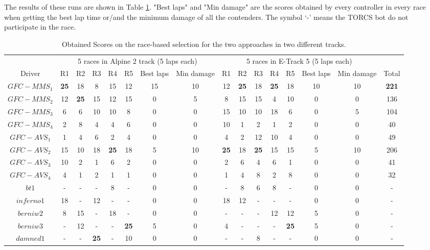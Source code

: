 \documentclass[conference]{IEEEtran}
\begin{document}
The results of these runs are shown in Table \ref{tab:runsresults}. "Best laps" and "Min damage" are the scores obtained by every controller in every race when getting the best lap time or/and the minimum damage of all the contenders. The symbol `-' means the TORCS bot do not participate in the race.

\begin{table}[ht]
  \centering
  {\scriptsize 
    \caption{ Obtained Scores on the race-based selection for the two approaches in two different tracks. }
		{
			\begin{tabular}{|c||c|c|c|c|c|c|c||c|c|c|c|c|c|c||c|}
				\hline
				&\multicolumn{7}{c||}{5 races in Alpine 2 track (5 laps each)}&\multicolumn{7}{c|}{5 races in E-Track 5 (5 laps each)}&\\
				\cline{2-16}
Driver	& 		  R1 & 		  R2 & 		 R3 & 		  R4& 		   R5&Best laps&Min damage& R1&R2&R3&R4&R5&Best laps&Min damage&Total\\
				\hline		
$GFC-MMS_1$ &\textbf{25}& 18		 &8			&15			&12        &15 &10&		12&\textbf{25}& 		18&\textbf{25}&		18&10&10&\textbf{221}\\
$GFC-MMS_2$ &12		 &\textbf{25}& 15 		&12			&15			&0&5&8			&15		  &			15&	4	&10&0&0&136\\
$GFC-MMS_3$ &6			 &6			&10			&10			&8			&0&0&15			&10		  &			10&	18	&6&0&5&104\\
$GFC-MMS_4$ &2			 &	8		&4			&4			&      6    &0&0& 10		& 1		  &		 2&1		&2&0&0&40\\
$GFC-AVS_1$ &1			 &4			&6			&2			&	4		&0&0&4		    &2		  &			12&	10	& 4&0&0&49\\					
$GFC-AVS_2$ &15		&10			& 18		&\textbf{25}&18			&5&10&\textbf{25}& 18	  &	\textbf{25} &15&15&5&10&206\\
$GFC-AVS_3$ &10		&2			&1			&6			&	2		&0&0&2			&6		  &			4&	6	&1&0&0&41\\
$GFC-AVS_4$ &4			&1			&2			&1			&	1		&0&0&1			&4	      &		8&	2	&8&0&0&32\\	
$bt1$ 	 &-			&-			&-			&8			&-			&0&0&-			&8		  &			 6&8		&-&0&0&-\\
$inferno1$&18		&-			&12			&-			&-			&0&0&18			&12		  &			-&-		& -& 0&0&-\\			
$berniw2$&8			&15			&-			&18			&-			&0&0&-			&-		&			-&12	&12&5&0&-\\
$berniw3$&-			&12			&-			&-			&\textbf{25}&5&0&4			&-		&			-&-		&\textbf{25}&5&0&-\\
$damned1$&-			&-			&\textbf{25}&-			&10			&0&0&-			&-		& 			8&-		& -&0&0&-\\			
				\hline
			
			\end{tabular}
		}\label{tab:runsresults}
	}
\end{table}
\end{document}
